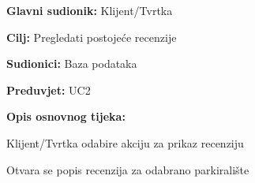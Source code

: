 \noindent {}
\begin{packed_item}
	
	\item \textbf{Glavni sudionik:} Klijent/Tvrtka
	\item  \textbf{Cilj:} Pregledati postojeće recenzije
	\item  \textbf{Sudionici:} Baza podataka
	\item  \textbf{Preduvjet:} UC2
	\item  \textbf{Opis osnovnog tijeka:}
	
	\item[] \begin{packed_enum}
		
		\item Klijent/Tvrtka odabire akciju za prikaz recenziju
		\item Otvara se popis recenzija za odabrano parkiralište
	
	\end{packed_enum}
\end{packed_item}


